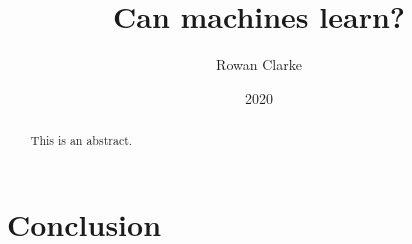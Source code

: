 \documentclass[letterpaper]{article}
\begin{document}
\title{Can machines learn?}
\date{2020}
\author{Rowan Clarke}
\maketitle

\begin{abstract}

This is an abstract.

\vspace{7mm}
\noindent

\end{abstract}

\newpage
\tableofcontents
\newpage







\section{Conclusion}
\label{conc}
\end{document}
